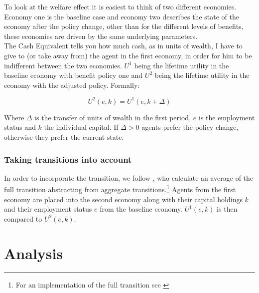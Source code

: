\documentclass[a4paper,12pt]{article}
\begin{document}
To look at the welfare effect it is easiest to think of two different economies. Economy one is the baseline case and economy two describes the state of the economy after the policy change, other than for the different levels of benefits, these economies are driven by the same underlying parameters.\\
The Cash Equivalent tells you how much cash, as in units of wealth, I have to give to (or take away from) the agent in the first economy, in order for him to be indifferent between the two economies. $U^{1}$ being the lifetime utility in the baseline economy with benefit policy one and $U^{2}$ being the lifetime utility in the economy with the adjusted policy. Formally: 

  \begin{equation}
  U^{2}(e,k) = U^{1}(e,k+\Delta) \nonumber
  \end{equation}

Where $\Delta$ is the transfer of units of wealth in the first period, $e$ is the employment status and $k$ the individual capital. If $ \Delta>0 $ agents prefer the policy change, otherwise they prefer the current state. 

\subsubsection*{Taking transitions into account}

In order to incorporate the transition, we follow \cite{KrusellMukoyamaSahin}, who calculate an average of the full transition abstracting from aggregate transitions.\footnote{For an implementation of the full transition see \citep{mukoyama}} Agents from the first economy are placed into the second economy along with their capital holdings $k$ and their employment status $e$ from the baseline economy. $U^{1}(e,k)$ is then compared to $U^{2}(e,k)$.

\section{Analysis}
\end{document}
